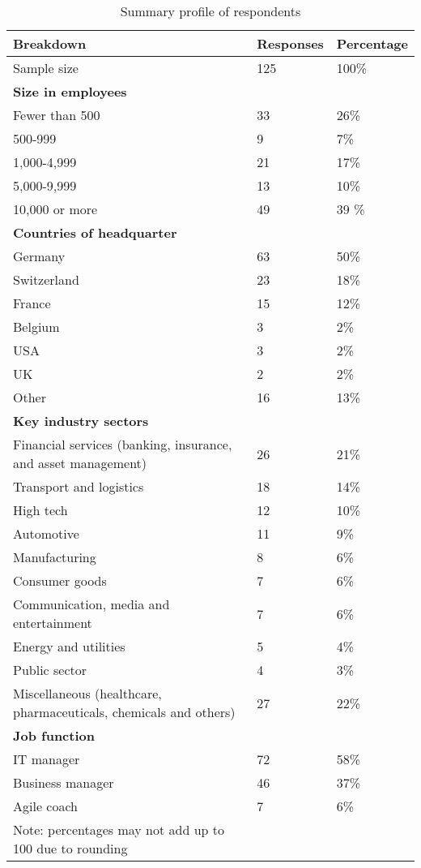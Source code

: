 \documentclass{article}
\begin{document}
 \begin{table}[hbt]
   \small
 \caption{Summary profile of respondents}
  \centering
  \begin{tabular}{lll}
  Breakdown & Responses & Percentage \\
    \midrule
   Sample size & 125 & 100\% \\
   \textbf{Size in employees} \\
    { } Fewer than 500 & 33 & 26\% \\
    { } 500-999 & 9 & 7\% \\
    { } 1,000-4,999 & 21 & 17\% \\
    { } 5,000-9,999 & 13 & 10\% \\
    { } 10,000 or more & 49 & 39 \% \\
    \midrule
    \textbf{Countries of headquarter} \\
    { } Germany & 63 & 50\% \\
    { } Switzerland & 23 & 18\% \\
    { } France & 15 & 12\% \\
    { } Belgium & 3 & 2\% \\
    { } USA & 3 & 2\% \\
    { } UK & 2 & 2\% \\
    { } Other & 16 & 13\% \\
    \midrule
    \textbf{Key industry sectors}\\
    { } Financial services (banking, insurance, and asset management) & 26 & 21\% \\
    { } Transport and logistics & 18 & 14\% \\
    { } High tech & 12 & 10\% \\
    { } Automotive & 11 & 9\% \\
    { } Manufacturing & 8 & 6\% \\
    { } Consumer goods & 7 & 6\% \\
    { } Communication, media and entertainment & 7 & 6\% \\
    { } Energy and utilities & 5 & 4\% \\
    { } Public sector & 4 & 3\% \\
    { } Miscellaneous (healthcare, pharmaceuticals, chemicals and others) & 27 & 22\%  \\
    \midrule
   \textbf{Job function} \\
    { } IT manager & 72 & 58\% \\
    { } Business manager & 46 & 37\% \\
    { } Agile coach & 7 & 6\% \\
    \bottomrule
    Note: percentages may not add up to 100 due to rounding
  \end{tabular}
  \label{tab:respondents-profile}
 \end{table}
\end{document}
